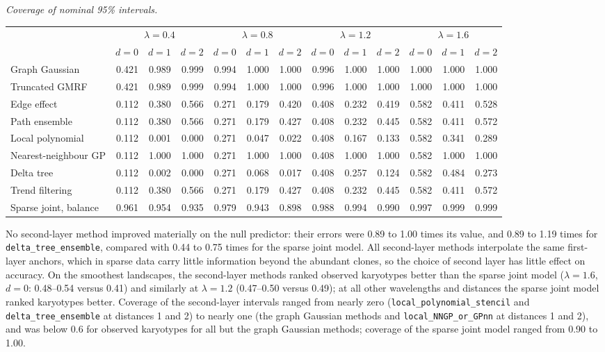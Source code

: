 \documentclass[11pt]{article}
\begin{document}
\noindent\textit{Coverage of nominal 95\% intervals.}
\begin{center}
\footnotesize
\setlength{\tabcolsep}{3pt}
\begin{tabular}{l*{12}{r}}
\toprule
 & \multicolumn{3}{c}{$\lambda=0.4$} & \multicolumn{3}{c}{$\lambda=0.8$} & \multicolumn{3}{c}{$\lambda=1.2$} & \multicolumn{3}{c}{$\lambda=1.6$} \\
\cmidrule(lr){2-4}\cmidrule(lr){5-7}\cmidrule(lr){8-10}\cmidrule(lr){11-13}
 & $d=0$ & $d=1$ & $d=2$ & $d=0$ & $d=1$ & $d=2$ & $d=0$ & $d=1$ & $d=2$ & $d=0$ & $d=1$ & $d=2$ \\
\midrule
Graph Gaussian & 0.421 & 0.989 & 0.999 & 0.994 & 1.000 & 1.000 & 0.996 & 1.000 & 1.000 & 1.000 & 1.000 & 1.000 \\
Truncated GMRF & 0.421 & 0.989 & 0.999 & 0.994 & 1.000 & 1.000 & 0.996 & 1.000 & 1.000 & 1.000 & 1.000 & 1.000 \\
Edge effect & 0.112 & 0.380 & 0.566 & 0.271 & 0.179 & 0.420 & 0.408 & 0.232 & 0.419 & 0.582 & 0.411 & 0.528 \\
Path ensemble & 0.112 & 0.380 & 0.566 & 0.271 & 0.179 & 0.427 & 0.408 & 0.232 & 0.445 & 0.582 & 0.411 & 0.572 \\
Local polynomial & 0.112 & 0.001 & 0.000 & 0.271 & 0.047 & 0.022 & 0.408 & 0.167 & 0.133 & 0.582 & 0.341 & 0.289 \\
Nearest-neighbour GP & 0.112 & 1.000 & 1.000 & 0.271 & 1.000 & 1.000 & 0.408 & 1.000 & 1.000 & 0.582 & 1.000 & 1.000 \\
Delta tree & 0.112 & 0.002 & 0.000 & 0.271 & 0.068 & 0.017 & 0.408 & 0.257 & 0.124 & 0.582 & 0.484 & 0.273 \\
Trend filtering & 0.112 & 0.380 & 0.566 & 0.271 & 0.179 & 0.427 & 0.408 & 0.232 & 0.445 & 0.582 & 0.411 & 0.572 \\
Sparse joint, balance & 0.961 & 0.954 & 0.935 & 0.979 & 0.943 & 0.898 & 0.988 & 0.994 & 0.990 & 0.997 & 0.999 & 0.999 \\
\bottomrule
\end{tabular}
\end{center}

No second-layer method improved materially on the null predictor: their
errors were 0.89 to 1.00 times its value, and 0.89 to 1.19 times for
\texttt{delta\_tree\_ensemble}, compared with 0.44 to 0.75 times for the
sparse joint model. All second-layer methods interpolate the same first-layer
anchors, which in sparse data carry little information beyond the abundant
clones, so the choice of second layer has little effect on accuracy. On the
smoothest landscapes, the second-layer methods ranked observed karyotypes
better than the sparse joint model ($\lambda=1.6$, $d=0$: 0.48--0.54 versus
0.41) and similarly at $\lambda=1.2$ (0.47--0.50 versus 0.49); at all other
wavelengths and distances the sparse joint model ranked karyotypes better.
Coverage of the second-layer intervals ranged from nearly zero
(\texttt{local\_polynomial\_stencil} and \texttt{delta\_tree\_ensemble} at
distances 1 and 2) to nearly one (the graph Gaussian methods and
\texttt{local\_NNGP\_or\_GPnn} at distances 1 and 2), and was below 0.6 for
observed karyotypes for all but the graph Gaussian methods; coverage of the
sparse joint model ranged from 0.90 to 1.00.
\end{document}
